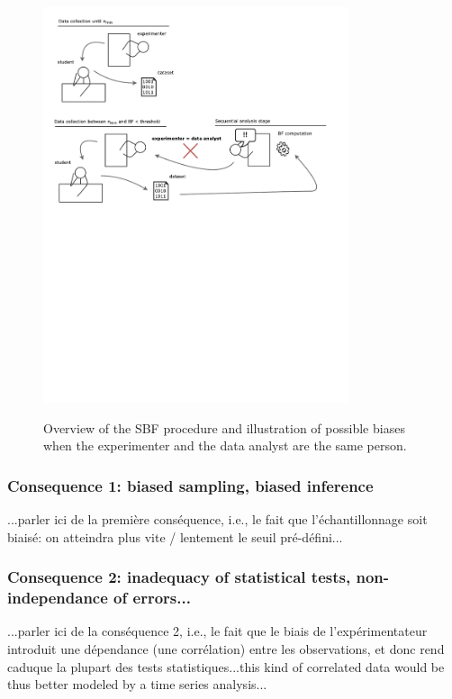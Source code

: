 \documentclass[a4paper,man,natbib,floatsintext]{apa6}
\begin{document}
\begin{figure}[H]
  \caption{Overview of the SBF procedure and illustration of possible biases when the experimenter and the data analyst are the same person.}
  \centering
  \includegraphics[width=0.8\textwidth]{figures/bias_diag.pdf}
  \label{fig:diag1}
\end{figure}

\subsubsection{Consequence 1: biased sampling, biased inference}

...parler ici de la première conséquence, i.e., le fait que l'échantillonnage soit biaisé: on atteindra plus vite / lentement le seuil pré-défini...

\subsubsection{Consequence 2: inadequacy of statistical tests, non-independance of errors...}

...parler ici de la conséquence 2, i.e., le fait que le biais de l'expérimentateur introduit une dépendance (une corrélation) entre les observations, et donc rend caduque la plupart des tests statistiques...this kind of correlated data would be thus better modeled by a time series analysis...
\end{document}
